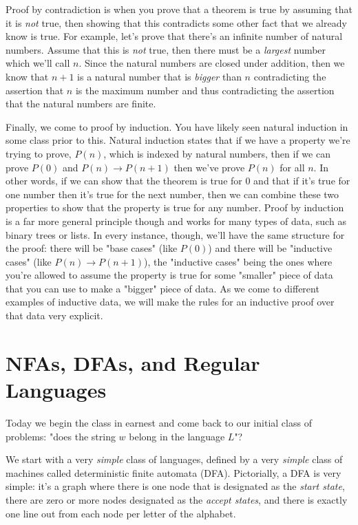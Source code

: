 \documentclass[11pt]{article}
\begin{document}
Proof by contradiction is when you prove that a theorem is true by assuming that it is \emph{not} true, then showing that this contradicts some other fact that we already know is true. For example, let's prove that there's an infinite number of natural numbers. Assume that this is \emph{not} true, then there must be a \emph{largest} number which we'll call $n$. Since the natural numbers are closed under addition, then we know that $n+1$ is a natural number that is \emph{bigger} than $n$ contradicting the assertion that $n$ is the maximum number and thus contradicting the assertion that the natural numbers are finite.

Finally, we come to proof by induction. You have likely seen natural induction in some class prior to this. Natural induction states that if we have a property we're trying to prove, $P(n)$, which is indexed by natural numbers, then if we can prove $P(0)$ and $P(n) \to P(n+1)$ then we've prove $P(n)$ for all $n$. In other words, if we can show that the theorem is true for 0 and that if it's true for one number then it's true for the next number, then we can combine these two properties to show that the property is true for any number. Proof by induction is a far more general principle though and works for many types of data, such as binary trees or lists. In every instance, though, we'll have the same structure for the proof: there will be "base cases" (like $P(0)$) and there will be "inductive cases" (like $P(n) \to P(n+1)$), the "inductive cases" being the ones where you're allowed to assume the property is true for some "smaller" piece of data that you can use to make a "bigger" piece of data. As we come to different examples of inductive data, we will make the rules for an inductive proof over that data very explicit.
\section{NFAs, DFAs, and Regular Languages}
\label{sec-2}
Today we begin the class in earnest and come back to our initial class of problems: "does the string $w$ belong in the language $L$"?

We start with a very \emph{simple} class of languages, defined by a very \emph{simple} class of machines called deterministic finite automata (DFA). Pictorially, a DFA is very simple: it's a graph where there is one node that is designated as the \emph{start state}, there are zero or more nodes designated as the \emph{accept states}, and there is exactly one line out from each node per letter of the alphabet.
\end{document}

